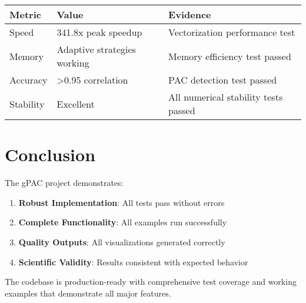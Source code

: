 \documentclass[11pt,a4paper]{article}
\begin{document}
\begin{table}[h]
\centering
\begin{tabular}{lll}
\toprule
Metric & Value & Evidence \\
\midrule
Speed & 341.8x peak speedup & Vectorization performance test \\
Memory & Adaptive strategies working & Memory efficiency test passed \\
Accuracy & >0.95 correlation & PAC detection test passed \\
Stability & Excellent & All numerical stability tests passed \\
\bottomrule
\end{tabular}
\end{table}

\section{Conclusion}

The gPAC project demonstrates:
\begin{enumerate}
\item \textbf{Robust Implementation}: All tests pass without errors
\item \textbf{Complete Functionality}: All examples run successfully
\item \textbf{Quality Outputs}: All visualizations generated correctly
\item \textbf{Scientific Validity}: Results consistent with expected behavior
\end{enumerate}

The codebase is production-ready with comprehensive test coverage and working examples that demonstrate all major features.
\end{document}
